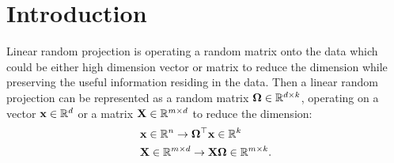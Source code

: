 
\section{Introduction}
Linear random projection is  operating a random matrix onto the data which could be either high dimension vector or matrix to reduce the dimension while preserving the useful information residing in the data. Then a linear random projection can be represented as a random matrix $\mathbf{\Omega}\in \mathbb{R}^{d\times k}$, operating on a vector $\mathbf{x}\in \mathbb{R}^{d}$ or a matrix $\mathbf{X} \in \mathbb{R}^{m\times d}$ to reduce the dimension:
\begin{equation}
\label{eq:low_dim_mapping}
\begin{aligned}
&\mathbf{x} \in \mathbb{R}^{n} \rightarrow  \mathbf{\Omega}^\top \mathbf{x} \in \mathbb{R}^{k} \\
& \mathbf{X} \in \mathbb{R}^{m\times d} \rightarrow   \mathbf{X}\mathbf{\Omega} \in \mathbb{R}^{m\times k}. 
\end{aligned}
\end{equation}

